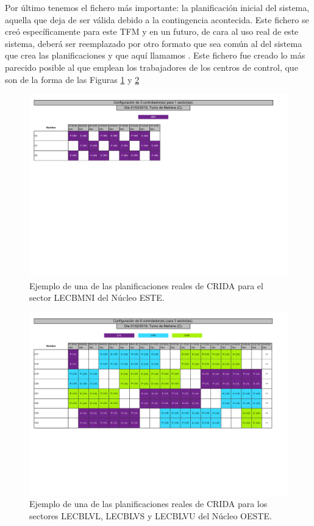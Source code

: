 Por último tenemos el fichero más importante: la planificación inicial del sistema, aquella que deja de ser válida debido a la contingencia acontecida. Este fichero se creó específicamente para este TFM y en un futuro, de cara al uso real de este sistema, deberá ser reemplazado por otro formato que sea común al del sistema que crea las planificaciones y que aquí llamamos \legacy{}. Este fichero fue creado lo más parecido posible al que emplean los trabajadores de los centros de control, que son de la forma de las Figuras \ref{fig:A:ejemplo-distribucion-crida-1} y \ref{fig:A:ejemplo-distribucion-crida-2}

\begin{figure}[h]
	\centering
	\includegraphics[width=\linewidth]{anexos/AnexoA-Formato-Planificacion-Inicial/recursos/ejemplo-distribucion-crida-1}
	\caption{Ejemplo de una de las planificaciones reales de CRIDA para el sector LECBMNI del Núcleo ESTE.}
	\label{fig:A:ejemplo-distribucion-crida-1}
\end{figure}

\begin{figure}[h]
	\centering
	\includegraphics[width=\linewidth]{anexos/AnexoA-Formato-Planificacion-Inicial/recursos/ejemplo-distribucion-crida-2}
	\caption{Ejemplo de una de las planificaciones reales de CRIDA para los sectores LECBLVL, LECBLVS y LECBLVU del Núcleo OESTE.}
	\label{fig:A:ejemplo-distribucion-crida-2}
\end{figure}


